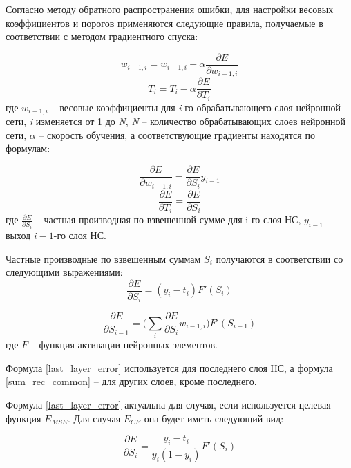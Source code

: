 Согласно методу обратного распространения ошибки, для настройки весовых коэффициентов и порогов применяются следующие правила, получаемые в соответствии с методом градиентного спуска:

\begin{equation}
	w_{i-1,i} = w_{i-1, i} - \alpha \frac{\partial E}{\partial w_{i-1, i}}
\end{equation}
\begin{equation}
	T_i = T_i - \alpha \frac{\partial E}{\partial T_i}
\end{equation}
где $w_{i-1,i}$ -- весовые коэффициенты для \textit{i}-го обрабатывающего слоя нейронной сети, \textit{i} изменяется от 1 до \textit{N}, \textit{N} -- количество обрабатывающих слоев нейронной сети, $\alpha$ -- скорость обучения, а соответствующие градиенты находятся по формулам:

\begin{equation}
	\label{weights_delta}
	\frac{\partial E}{\partial w_{i-1, i}} = \frac{\partial E}{\partial S_i} y_{i-1}
\end{equation}
\begin{equation}
	\label{biases_delta}
	\frac{\partial E}{\partial T_i} = \frac{\partial E}{\partial S_i}
\end{equation}
где $\frac{\partial E}{\partial S_i}$ -- частная производная по взвешенной сумме для i-го слоя НС, $y_{i-1}$ -- выход $i-1$-го слоя НС.


Частные производные по взвешенным суммам $S_i$ получаются в соответствии со следующими выражениями:
\begin{equation}
	\label{last_layer_error}
	\frac{\partial E}{\partial S_i} = (y_i - t_i)F'(S_i)
\end{equation}

\begin{equation}
	\label{sum_rec_common}
	\frac{\partial E}{\partial S_{i-1}} = \Bigg(\sum_{i}\frac{\partial E}{\partial S_i}w_{i-1, i}\Bigg)F'(S_{i-1})
\end{equation}
где $F$ -- функция активации нейронных элементов.

Формула \ref{last_layer_error} используется для последнего слоя НС, а формула \ref{sum_rec_common} -- для других слоев, кроме последнего.

Формула \ref{last_layer_error} актуальна для случая, если используется целевая функция $E_{MSE}$. Для случая $E_{CE}$ она будет иметь следующий вид:

\begin{equation}
	\label{last_layer_error_ce}
	\frac{\partial E}{\partial S_i} = \frac{y_i - t_i}{y_i(1-y_i)}F'(S_i)
\end{equation}

